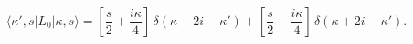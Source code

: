 \begin{equation}
\langle\kappa',s|L_0|\kappa,s\rangle=
\left[\frac{s}{2}+\frac{i\kappa}{4}\right]\,\delta(\kappa-2i-\kappa')
+
\left[\frac{s}{2}-\frac{i\kappa}{4}\right]\,\delta(\kappa+2i-\kappa').
\end{equation}

